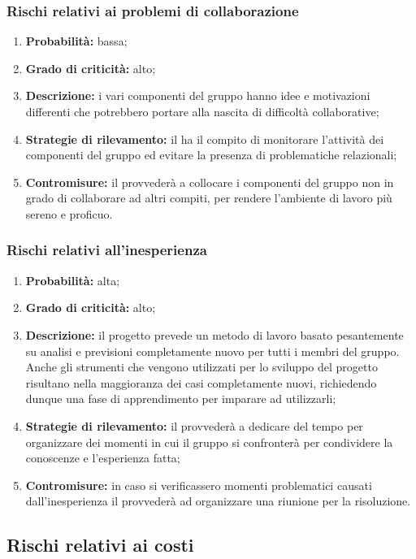 \subsubsection{Rischi relativi ai problemi di collaborazione}
\begin{enumerate}
	\item \textbf{Probabilità:} bassa;
	\item \textbf{Grado di criticità:} alto;
	\item \textbf{Descrizione:} i vari componenti del gruppo hanno idee e motivazioni differenti che potrebbero portare alla nascita di difficoltà collaborative;
	\item \textbf{Strategie di rilevamento:} il \Responsabile ha il compito di monitorare l’attività dei componenti del gruppo ed evitare la presenza di problematiche relazionali;
	\item \textbf{Contromisure:} il \Responsabile provvederà a collocare i componenti del gruppo non in grado di collaborare ad altri compiti, per rendere l’ambiente di lavoro più sereno e proficuo.
\end{enumerate}

\subsubsection{Rischi relativi all'inesperienza}
\begin{enumerate}
	\item \textbf{Probabilità:} alta;
	\item \textbf{Grado di criticità:} alto;
	\item \textbf{Descrizione:} il progetto prevede un metodo di lavoro basato pesantemente su analisi e previsioni completamente nuovo per tutti i membri del gruppo. Anche gli strumenti che vengono utilizzati per lo sviluppo del progetto risultano nella maggioranza dei casi completamente nuovi, richiedendo dunque una fase di apprendimento per imparare ad utilizzarli;
	\item \textbf{Strategie di rilevamento:} il \Responsabile provvederà a dedicare del tempo per organizzare dei momenti in cui il gruppo si confronterà per condividere la conoscenze e l'esperienza fatta;
	\item \textbf{Contromisure:} in caso si verificassero momenti problematici causati dall'inesperienza il \Responsabile provvederà ad organizzare una riunione per la risoluzione.
\end{enumerate}

\subsection{Rischi relativi ai costi}
